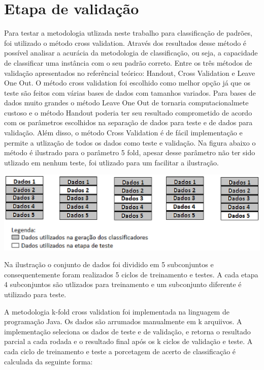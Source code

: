 \section{Etapa de validação}
Para testar a metodologia utlizada neste trabalho para classificação de padrões, foi utilizado o método cross validation. Através dos resultados desse método é possível analisar a acurácia da metodologia de classificação, ou seja, a capacidade de classificar uma instância com o seu padrão correto.
Entre os três métodos de validação apresentados no referêncial teórico: Handout, Cross Validation e Leave One Out. O método cross validation foi escolhido como melhor opção já que os teste são feitos com várias bases de dados com tamanhos variados. Para bases de dados muito grandes o método Leave One Out de tornaria computacionalmete custoso e o método Handout poderia ter seu resultado comprometido de acordo com os parâmetros escolhidos na separação de dados para teste e de dados para validação. Além disso, o método Cross Validation é de fácil implementação e permite a utlização de todos os dados como teste e validação.
Na figura abaixo o método é ilustrado para o parâmetro 5 fold, apesar desse parâmetro não ter sido utlizado em nenhum teste, foi utlizado para um facilitar a ilustração.
\begin{center}
	\includegraphics[scale=1.0]{graficos/cross_validation}
	\label{img:cross_validation}
\end{center}

Na ilustração o conjunto de dados foi dividido em 5 subconjuntos e consequentemente foram realizados 5 ciclos de treinamento e testes. A cada etapa 4 subconjuntos são utlizados para treinamento e um subconjunto diferente é utilizado para teste. 

A metodologia k-fold cross validation foi implementada na linguagem de programação Java. Os dados são arrumados manualmente em k arquiivos. A implementação seleciona os dados de teste e de validação, e retorna o resultado parcial a cada rodada e o resultado final após os k ciclos de validação e teste. A cada ciclo de treinamento e teste a porcetagem de acerto de classificação é calculada da seguinte forma:

